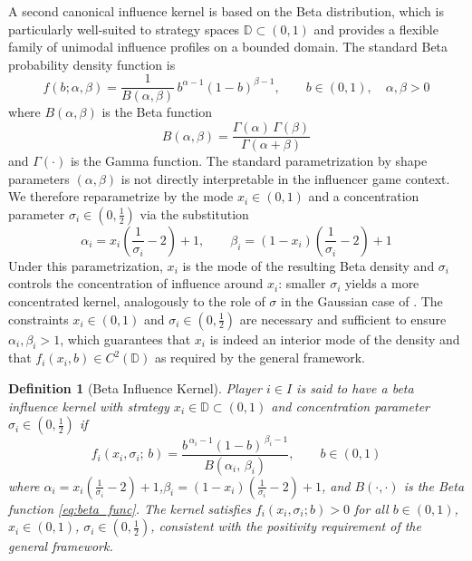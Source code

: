 \documentclass{article}
\newtheorem{definition}{Definition}
\begin{document}
                A second canonical influence kernel is based on the Beta distribution, which is particularly well-suited to strategy spaces $\mathbb{D} \subset (0,1)$ and provides a flexible family of unimodal influence profiles on a bounded domain. The standard Beta probability density function is
                \begin{equation}\label{eq:beta_dist}
                    f(b;\alpha,\beta) = \frac{1}{B(\alpha,\beta)}\,b^{\alpha-1}(1-b)^{\beta-1}, 
                    \qquad b \in (0,1),\quad \alpha,\beta > 0
                \end{equation}
                where $B(\alpha,\beta)$ is the Beta function
                \begin{equation}\label{eq:beta_func}
                    B(\alpha,\beta) = \frac{\Gamma(\alpha)\,\Gamma(\beta)}{\Gamma(\alpha+\beta)}
                \end{equation}
                and $\Gamma(\cdot)$ is the Gamma function. The standard parametrization by shape parameters $(\alpha,\beta)$ is not directly interpretable in the influencer game context. We therefore reparametrize by the mode $x_i \in (0,1)$ and a concentration parameter $\sigma_i \in (0, \frac{1}{2})$ via the substitution
                \begin{equation}\label{eq:beta_subs}
                    \alpha_i = x_i\!\left(\frac{1}{\sigma_i} - 2\right) + 1, \qquad 
                    \beta_i = (1-x_i)\!\left(\frac{1}{\sigma_i} - 2\right) + 1
                \end{equation}
                Under this parametrization, $x_i$ is the mode of the resulting Beta density and $\sigma_i$ controls the concentration of influence around $x_i$: smaller $\sigma_i$ yields a more concentrated kernel, analogously to the role of $\sigma$ in the Gaussian case of . The constraints $x_i \in (0,1)$ and $\sigma_i \in (0, \frac{1}{2})$ are necessary and sufficient to ensure $\alpha_i, \beta_i > 1$, which guarantees that $x_i$ is indeed an interior mode of the density and that $f_i(x_i, b) \in C^2(\mathbb{D})$ as required by the general framework.

                \begin{definition}[Beta Influence Kernel]\label{def:beta_infl}
                    Player $i \in I$ is said to have a beta influence kernel with strategy $x_i \in \mathbb{D} \subset (0,1)$ and concentration parameter $\sigma_i \in (0, \frac{1}{2})$ if
                    \begin{equation}\label{eq:beta_kernel}
                        f_i(x_i, \sigma_i;\, b) = \frac{b^{\,\alpha_i - 1}(1-b)^{\,\beta_i - 1}}{B(\alpha_i,\, \beta_i)}, \qquad b \in (0,1)
                    \end{equation}
                    where $\alpha_i = x_i\!\left(\frac{1}{\sigma_i}-2\right)+1$,$\beta_i = (1-x_i)\!\left(\frac{1}{\sigma_i}-2\right)+1$, and $B(\cdot,\cdot)$ is the Beta function \cref{eq:beta_func}. The kernel satisfies $f_i(x_i,\sigma_i;b) > 0$ for all $b \in (0,1)$, $x_i \in (0,1)$, $\sigma_i \in (0,\frac{1}{2})$, consistent with the positivity requirement of the general framework.
                \end{definition}
\end{document}
